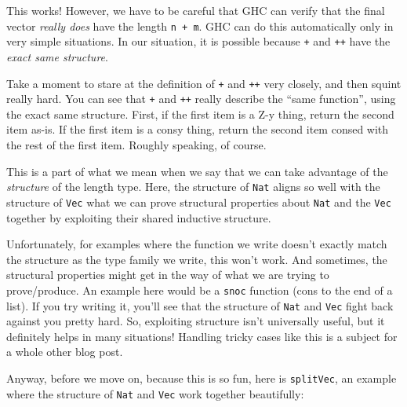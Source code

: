 \documentclass[]{article}
\begin{document}
This works! However, we have to be careful that GHC can verify that the final
vector \emph{really does} have the length \texttt{n\ +\ m}. GHC can do this
automatically only in very simple situations. In our situation, it is possible
because \texttt{+} and \texttt{++} have the \emph{exact same structure}.

Take a moment to stare at the definition of \texttt{+} and \texttt{++} very
closely, and then squint really hard. You can see that \texttt{+} and
\texttt{++} really describe the ``same function'', using the exact same
structure. First, if the first item is a Z-y thing, return the second item
as-is. If the first item is a consy thing, return the second item consed with
the rest of the first item. Roughly speaking, of course.

This is a part of what we mean when we say that we can take advantage of the
\emph{structure} of the length type. Here, the structure of \texttt{Nat} aligns
so well with the structure of \texttt{Vec} what we can prove structural
properties about \texttt{Nat} and the \texttt{Vec} together by exploiting their
shared inductive structure.

Unfortunately, for examples where the function we write doesn't exactly match
the structure as the type family we write, this won't work. And sometimes, the
structural properties might get in the way of what we are trying to
prove/produce. An example here would be a \texttt{snoc} function (cons to the
end of a list). If you try writing it, you'll see that the structure of
\texttt{Nat} and \texttt{Vec} fight back against you pretty hard. So, exploiting
structure isn't universally useful, but it definitely helps in many situations!
Handling tricky cases like this is a subject for a whole other blog post.

Anyway, before we move on, because this is so fun, here is \texttt{splitVec}, an
example where the structure of \texttt{Nat} and \texttt{Vec} work together
beautifully:
\end{document}
